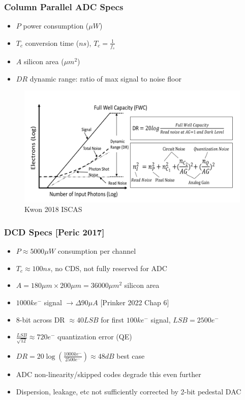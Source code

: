 \documentclass{beamer}
\begin{document}
\begin{frame}
    \frametitle{Column Parallel ADC Specs}
    \begin{itemize}
    \item $P$ power consumption ($\mu W$)
    \item $T_c$ conversion time ($ns$), $T_c=\frac{1}{f_s}$
    \item $A$ silicon area ($\mu m^2$)
    \item $DR$ dynamic range: ratio of max signal to noise floor
    \end{itemize}
    \begin{figure}
        \includegraphics[width=\textwidth]{dr.png}
        \caption{Kwon 2018 ISCAS}
    \end{figure}
\end{frame}

\begin{frame}
    \frametitle{DCD Specs [Peric 2017]}
    \begin{itemize}
    \item $P \approx 5000 \mu W$ consumption per channel
    \item $T_c \approx 100 ns$, no CDS, not fully reserved for ADC
    \item $A = 180\mu m\times 200\mu m = 36000\mu m^2$ silicon area
    \item $1000ke^-$ signal $\rightarrow \Delta 90\mu A$ [Prinker 2022 Chap 6]
    \item 8-bit across DR $\approx 40 LSB$ for first $100ke^-$ signal, $LSB=2500e^-$
    \item $\frac{LSB}{\sqrt{12}} \approx 720 e^-$ quantization error (QE)
    \item $DR = 20\log{(\frac{1000ke^-}{2500e^-})}\approx 48 dB$ best case
    \item ADC non-linearity/skipped codes degrade this even further
    \item Dispersion, leakage, etc not sufficiently corrected by 2-bit pedestal DAC
    \end{itemize}
\end{frame}
\end{document}
